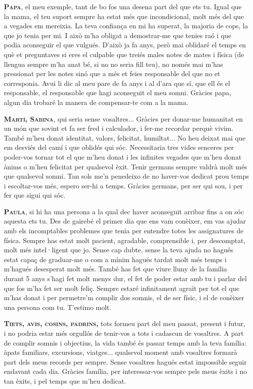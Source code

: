\textsc{\textbf{Papa}}, el meu exemple, tant de bo fos una desena part del que ets tu. Igual que la mama, el teu suport sempre ha estat més que incondicional, molt més del que a vegades em mereixia. La teva confiança en mi ha superat, la majoria de cops, la que jo tenia per mi. I això m'ha obligat a demostrar-me que tenies raó i que podia aconseguir el que vulgués. D'això ja fa anys, però mai oblidaré el temps en què et preguntaves si eres el culpable que treiés males notes de mates i física (de llengua sempre m'ha anat bé, si no no seria fill teu), no només mai m'has pressionat per les notes sinó que a més et feies responsable del que no et corresponia. Avui li dic al meu pare de fa anys i al d'ara que sí, que ell és el responsable, el responsable que hagi aconseguit el meu somni. Gràcies papa, algun dia trobaré la manera de compensar-te com a la mama.

\textsc{\textbf{Martí, Sabina}}, qui seria sense vosaltres... Gràcies per donar-me humanitat en un món que sovint et fa ser fred i calculador, i fer-me recordar perquè vivim. També m'heu donat identitat, valors, felicitat, humiltat... No heu deixat mai que em desviés del camí i que oblidés qui sóc. Necessitaria tres vides senceres per poder-vos tornar tot el que m'heu donat i les infinites vegades que m'heu donat ànims o m'heu felicitat per qualsevol èxit. Tenir germans sempre valdrà molt més que qualsevol somni. Tan sols me'n penedeixo de no haver-vos dedicat prou temps i escoltar-vos més, espero ser-hi a temps. Gràcies germans, per ser qui sou, i per fer que sigui qui sóc.


\textsc{\textbf{Paula}}, si hi ha una persona a la qual dec haver aconseguit arribar fins a on sóc aquesta ets tu. Des de gairebé el primer dia que ens vam conèixer, em vas ajudar amb els incomptables problemes que tenia per entendre totes les assignatures de física. Sempre has estat molt pacient, agradable, comprensible i, per descomptat, molt més intel·ligent que jo. Sense cap dubte, sense la teva ajuda no hagués estat capaç de graduar-me o com a mínim hagués tardat molt més temps i m'hagués desesperat molt més. També has fet que viure lluny de la família durant 5 anys s'hagi fet molt menys dur, el fet de poder estar amb tu i parlar del que fos m'ha fet ser molt feliç. Sempre estaré infinitament agraït per tot el que m'has donat i per permetre'm complir dos somnis, el de ser físic, i el de conèixer una persona com tu. T'estimo molt.

\textsc{\textbf{Tiets, avis, cosins, padrins,}} tots formeu part del meu passat, present i futur, i no podria estar més orgullós de tenir-vos a tots i cadascun de vosaltres. A part de complir somnis i objectius, la vida també és passar temps amb la teva família: àpats familiars, excursions, viatges... qualsevol moment amb vosaltres formarà part dels meus records per sempre. Sense vosaltres hagués estat impossible seguir endavant cada dia. Gràcies família, per interessar-vos sempre pels meus èxits i no tan èxits, i pel temps que m'heu dedicat. 



